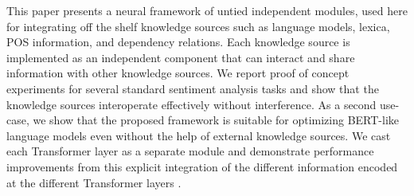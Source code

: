 This paper presents a neural framework of untied independent modules, used here for integrating off the shelf knowledge sources such as language models, lexica, POS information, and dependency relations. Each knowledge source is implemented as an independent component that can interact and share information with other knowledge sources. We report proof of concept experiments for several standard sentiment analysis tasks and show that the knowledge sources interoperate effectively without interference. As a second use-case, we show that the proposed framework is suitable for optimizing  BERT-like language models even without the help of external knowledge sources. We cast each Transformer layer as a separate module and demonstrate performance improvements from this explicit integration of the different information encoded at the different Transformer layers .
